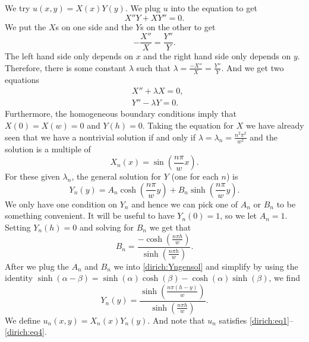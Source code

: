 We try $u(x,y) = X(x)Y(y)$.  We plug $u$ into the equation to get
\begin{equation*}
X''Y + XY'' = 0 .
\end{equation*}
We put the $X$s on one side and the $Y$s on the other to get
\begin{equation*}
- \frac{X''}{X} = \frac{Y''}{Y} .
\end{equation*}
The left hand side only depends on $x$ and the right hand side only depends
on $y$.  Therefore, there is some constant $\lambda$ such that
$\lambda = \frac{-X''}{X} = \frac{Y''}{Y}$.
And we get two equations
\begin{align*}
& X'' + \lambda X = 0 , \\
& Y'' - \lambda Y = 0 .
\end{align*}
Furthermore, the homogeneous boundary conditions imply that
$X(0) = X(w) = 0$ and $Y(h) = 0$.  Taking the equation for $X$
we have already seen that we have a nontrivial solution if and only if
$\lambda = \lambda_n = \frac{n^2 \pi^2}{w^2}$ and the solution is
a multiple of
\begin{equation*}
X_n(x) = \sin \left( \frac{n \pi}{w} x \right) .
\end{equation*}
For these given $\lambda_n$,
the general solution for $Y$ (one for each $n$) is
\begin{equation} \label{dirich:Yngensol}
Y_n(y) = A_n \cosh \left( \frac{n \pi}{w} y \right)
+ B_n \sinh \left( \frac{n \pi}{w} y \right) .
\end{equation}
We only have one condition on $Y_n$ and hence we can pick one of $A_n$
or $B_n$
to be something convenient.
It will be useful to have $Y_n(0) = 1$, so we let $A_n=1$.
Setting $Y_n(h) = 0$ and solving for $B_n$ we get that
\begin{equation*}
B_n = \frac{- \cosh \left( \frac{n \pi h }{w} \right)}%
{\sinh \left( \frac{n \pi h }{w} \right)} .
\end{equation*}
After we plug the $A_n$ and $B_n$ we
into \eqref{dirich:Yngensol} and simplify by using
the identity $\sinh(\alpha-\beta) =
\sinh(\alpha) \cosh(\beta) -
\cosh(\alpha) \sinh(\beta)$, we find
\begin{equation*}
Y_n(y) =
\frac{\sinh \left( \frac{n \pi (h-y) }{w} \right)}%
{\sinh \left( \frac{n \pi h }{w} \right)} .
\end{equation*}
We define $u_n(x,y) = X_n(x)Y_n(y)$.
And note that $u_n$
satisfies \eqref{dirich:eq1}--\eqref{dirich:eq4}.



